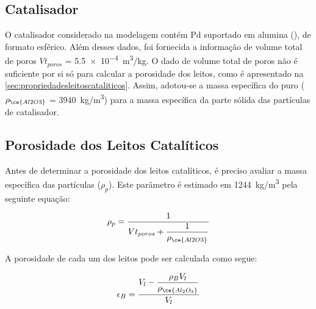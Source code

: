 
\subsection{Catalisador} \label{sec:catalisador}

O catalisador considerado na modelagem contém Pd suportado em alumina
(), de formato esférico. Além desses dados, foi fornecida a informação
de volume total de poros $Vt_{poros}$ = \SI{5,5e-4}{m^3/kg}. O dado
de volume total de poros não é suficiente por si só para calcular a porosidade dos leitos,
como é apresentado na \autoref{sec:propriedadesleitoscataliticos}. Assim,
adotou-se a massa específica do  puro ($\rho_{\ce{Al2O3}}$ = \SI{3940}
{kg/m^3}) para a massa específica da parte sólida das partículas de catalisador.


\subsection{Porosidade dos Leitos Catalíticos}
\label{sec:propriedadesleitoscataliticos}

Antes de determinar a porosidade dos leitos catalíticos, é preciso avaliar a
massa específica das partículas ($\rho_{p}$). Este parâmetro é estimado em
\SI{1244}{kg/m^3} pela seguinte equação:

\begin{equation}
\rho_{p} = \dfrac{1}{Vt_{poros}+\dfrac{1}{\rho_{\ce{Al2O3}}}}
\label{eq:rhoparticula}
\end{equation}


A porosidade de cada um dos leitos pode ser calculada como segue:

\begin{equation}
\epsilon_{B} = \dfrac{V_{l}-\dfrac{\rho_{B}V_l}{\rho_{\ce{Al_2O_3}}}}{V_l}
\label{eq:porosidade}
\end{equation}

